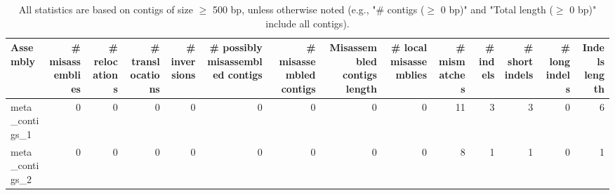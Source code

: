 \documentclass[12pt,a4paper]{article}
\begin{document}
\begin{table}[ht]
\begin{center}
\caption{All statistics are based on contigs of size $\geq$ 500 bp, unless otherwise noted (e.g., "\# contigs ($\geq$ 0 bp)" and "Total length ($\geq$ 0 bp)" include all contigs).}
\begin{tabular}{|l*{13}{|r}|}
\hline
Assembly & \# misassemblies &     \# relocations &     \# translocations &     \# inversions & \# possibly misassembled contigs & \# misassembled contigs & Misassembled contigs length & \# local misassemblies & \# mismatches & \# indels &     \# short indels &     \# long indels & Indels length \\ \hline
meta\_contigs\_1 & 0 & 0 & 0 & 0 & 0 & 0 & 0 & 0 & 11 & 3 & 3 & 0 & 6 \\ \hline
meta\_contigs\_2 & 0 & 0 & 0 & 0 & 0 & 0 & 0 & 0 & 8 & 1 & 1 & 0 & 1 \\ \hline
\end{tabular}
\end{center}
\end{table}
\end{document}
